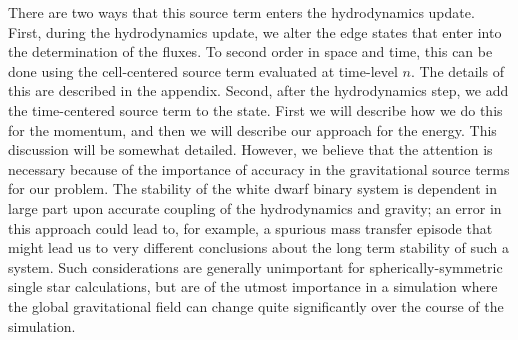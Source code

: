 \documentclass{emulateapj}
\begin{document}
There are two ways that this source term enters the hydrodynamics update.
First, during the hydrodynamics update, we alter the edge states that enter
into the determination of the fluxes. To second order in space and time, 
this can be done using the cell-centered
source term evaluated at time-level $n$. The details of this are described in 
the appendix. Second, after the hydrodynamics step, we add the time-centered source term
to the state. First we will describe how we do this for the momentum,
and then we will describe our approach for the energy. This discussion will be somewhat detailed.
However, we believe that the attention is necessary because of the importance of accuracy
in the gravitational source terms for our problem. The stability of the white dwarf binary
system is dependent in large part upon accurate coupling of the hydrodynamics and gravity;
an error in this approach could lead to, for example, a spurious mass transfer episode
that might lead us to very different conclusions about the long term stability of such a system.
Such considerations are generally unimportant for spherically-symmetric single star calculations,
but are of the utmost importance in a simulation where the global gravitational field can change 
quite significantly over the course of the simulation.
\end{document}
